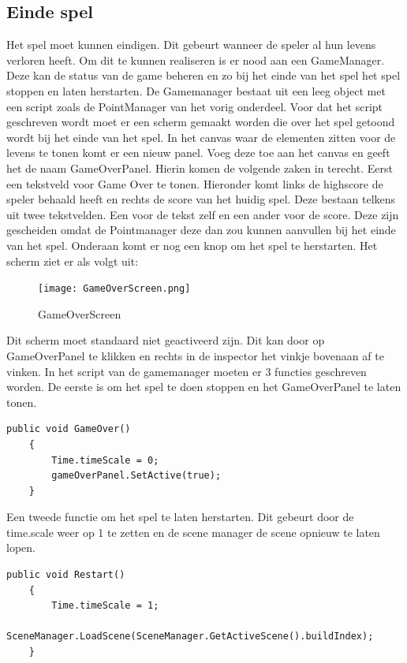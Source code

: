 \subsection{Einde spel}
Het spel moet kunnen eindigen. Dit gebeurt wanneer de speler al hun levens verloren heeft. Om dit te kunnen realiseren is er nood aan een GameManager. Deze kan de status van de game beheren en zo bij het einde van het spel het spel stoppen en laten herstarten. De Gamemanager bestaat uit een leeg object met een script zoals de PointManager van het vorig onderdeel. Voor dat het script geschreven wordt moet er een scherm gemaakt worden die over het spel getoond wordt bij het einde van het spel. In het canvas waar de elementen zitten voor de levens te tonen komt er een nieuw panel. Voeg deze toe aan het canvas en geeft het de naam GameOverPanel. Hierin komen de volgende zaken in terecht. Eerst een tekstveld voor Game Over te tonen. Hieronder komt links de highscore de speler behaald heeft en rechts de score van het huidig spel. Deze bestaan telkens uit twee tekstvelden. Een voor de tekst zelf en een ander voor de score. Deze zijn gescheiden omdat de Pointmanager deze dan zou kunnen aanvullen bij het einde van het spel. Onderaan komt er nog een knop om het spel te herstarten. Het scherm ziet er als volgt uit:

\begin{figure}[H]
    \centering
    \texttt{[image: GameOverScreen.png]}
    \caption{GameOverScreen}
    \label{fig:GameOverScreen}
\end{figure}

Dit scherm moet standaard niet geactiveerd zijn. Dit kan door op GameOverPanel te klikken en rechts in de inspector het vinkje bovenaan af te vinken.
In het script van de gamemanager moeten er 3 functies geschreven worden. De eerste is om het spel te doen stoppen en het GameOverPanel te laten tonen. 

\begin{lstlisting}[style=csharp]
        public void GameOver()
    {
        Time.timeScale = 0;
        gameOverPanel.SetActive(true);
    }
\end{lstlisting}

Een tweede functie om het spel te laten herstarten. Dit gebeurt door de time.scale weer op 1 te zetten en de  scene manager de scene opnieuw te laten lopen.
\begin{lstlisting}[style=csharp]
    public void Restart()
    {
        Time.timeScale = 1;
        SceneManager.LoadScene(SceneManager.GetActiveScene().buildIndex);
    }
    
\end{lstlisting}

